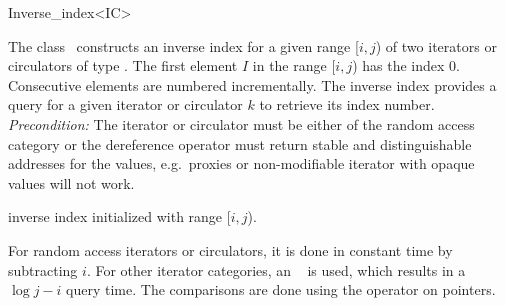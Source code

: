 \begin{ccRefClass}{Inverse_index<IC>}
  
  \ccDefinition The class \ccClassTemplateName\ constructs an inverse
  index for a given range [$i,j$) of two iterators or circulators of
  type .  The first element $I$ in the range [$i,j$) has the
  index 0.  Consecutive elements are numbered incrementally. The
  inverse index provides a query for a given iterator or circulator
  $k$ to retrieve its index number. {\em Precondition:}\/ The iterator
  or circulator must be either of the random access category or the
  dereference operator must return stable and distinguishable
  addresses for the values, e.g.~proxies or non-modifiable iterator
  with opaque values will not work.


  \ccCreation{}
  
  
  \ccGlue{}
  
  \ccGlue{}
  {inverse index initialized with range [$i,j$).}

  \ccOperations
  
  

  \ccImplementation
  
  For random access iterators or circulators, it is done in constant
  time by subtracting $i$. For other iterator categories, an \stl\ 
   is used, which results in a $\log j-i$ query time. The
  comparisons are done using the operator \ccc{operator<} on pointers.

  \ccSeeAlso
  \\

\end{ccRefClass}

